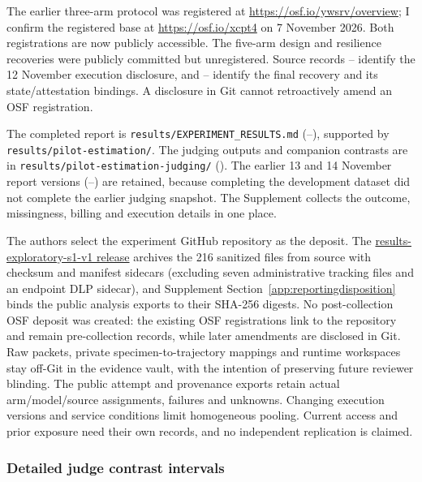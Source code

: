 The earlier three-arm protocol was registered at
\url{https://osf.io/ywsrv/overview}; I confirm the registered base at
\url{https://osf.io/xcpt4} on 7 November 2026. Both registrations are now
publicly accessible. The five-arm design and resilience recoveries were
publicly committed but unregistered. Source records --
identify the 12 November execution disclosure, and --
identify the final recovery and its state/attestation bindings. A disclosure in Git
cannot retroactively amend an OSF registration.

The completed report is \nolinkurl{results/EXPERIMENT_RESULTS.md}
(--), supported by
\nolinkurl{results/pilot-estimation/}. The judging outputs and companion
contrasts are in \nolinkurl{results/pilot-estimation-judging/}
(). The earlier 13 and 14 November report versions
(--) are retained, because completing the development
dataset did not complete the earlier judging snapshot. The Supplement collects
the outcome, missingness, billing and execution details in one place.

The authors select the experiment GitHub repository as the deposit.
The \href{https://github.com/jmservera/ama-thought-mve/releases/tag/results-exploratory-s1-v1}
{results-exploratory-s1-v1 release} archives the 216 sanitized
files from source  with checksum and manifest sidecars
(excluding seven administrative tracking files and an endpoint DLP sidecar),
and Supplement Section~\ref{app:reportingdisposition} binds the public
analysis exports to their SHA-256 digests. No post-collection OSF deposit
was created: the existing OSF registrations link to the repository and
remain pre-collection records, while later amendments are disclosed in Git.
Raw packets, private specimen-to-trajectory mappings and runtime workspaces
stay off-Git in the evidence vault, with the intention of preserving future
reviewer blinding.
The public attempt and provenance exports retain actual arm/model/source
assignments, failures and unknowns. Changing execution versions and service
conditions limit homogeneous pooling. Current access and prior exposure
need their own records, and no independent replication is claimed.




\subsubsection{Detailed judge contrast intervals}

